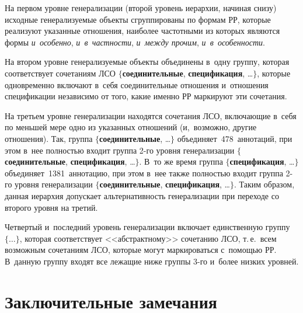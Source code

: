 \begin{multicols}{2}
  На первом уровне генерализации (второй уровень иерархии, начиная снизу) 
исходные генерализуемые объекты сгруппированы по формам РР, которые 
реализуют указанные отношения, наиболее частотными из которых являются 
формы \textit{и~особенно}, \textit{и~в~частности}, \textit{и~между прочим}, 
\textit{и~в~особенности}.
  
  На втором уровне генерализуемые объекты объединены в~одну группу, 
которая соответствует сочетаниям ЛСО $\{$\textbf{соединительные}, 
\textbf{спецификация}, \ldots$\}$, которые одновременно включают в~себя 
соединительные отношения и~отношения спецификации независимо от того, 
какие именно РР маркируют эти сочетания. 
  
  На третьем уровне генерализации находятся сочетания ЛСО, включающие 
в~себя по меньшей мере одно из указанных отношений (и,~возможно, другие 
отношения). Так, группа $\{$\textbf{соединительные}, \ldots$\}$ 
объединяет~478~аннотаций, при этом в~нее полностью входит группа 2-го 
уровня генерализации $\{$\textbf{соединительные}, \textbf{спецификация}, 
\ldots$\}$. В~то же время группа $\{$\textbf{спецификация}, \ldots$\}$ 
объединяет~1381~аннотацию, при этом в~нее также полностью входит группа 
2-го уровня генерализации $\{$\textbf{соединительные}, 
\textbf{спецификация}, \ldots$\}$. Таким образом, данная иерархия допускает 
альтернативность генерализации при переходе со второго уровня на третий.
  
  
  Четвертый и~последний уровень генерализации включает единственную 
группу $\{\ldots\}$, которая соответствует <<абстрактному>> сочетанию ЛСО, 
т.\,е.\ всем возможным сочетаниям ЛСО, которые могут маркироваться 
с~помощью РР. В~данную группу входят все лежащие ниже группы 3-го 
и~более низких уровней.

\vspace*{-6pt}
  
\section{Заключительные замечания}

\vspace*{-2pt}


\end{multicols}
